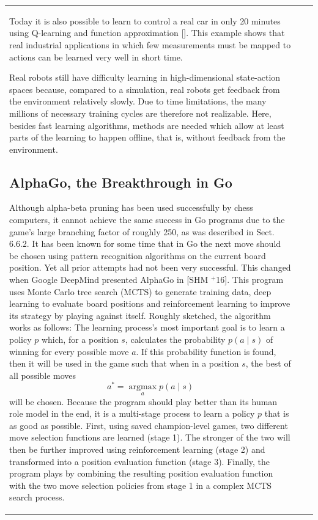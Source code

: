 \documentclass[10pt]{book}
\begin{document}
\begin{center}
\begin{tabular}{|l|l|l|}
Today it is also possible to learn to control a real car in only 20 minutes using Q-learning and function approximation [\cite{rmd07}]. This example shows that real industrial applications in which few measurements must be mapped to actions can be learned very well in short time.

Real robots still have difficulty learning in high-dimensional state-action spaces because, compared to a simulation, real robots get feedback from the environment relatively slowly. Due to time limitations, the many millions of necessary training cycles are therefore not realizable. Here, besides fast learning algorithms, methods are needed which allow at least parts of the learning to happen offline, that is, without feedback from the environment.

\subsection{AlphaGo, the Breakthrough in Go}
Although alpha-beta pruning has been used successfully by chess computers, it cannot achieve the same success in Go programs due to the game's large branching factor of roughly 250, as was described in Sect. 6.6.2. It has been known for some time that in Go the next move should be chosen using pattern recognition algorithms on the current board position. Yet all prior attempts had not been very successful. This changed when Google DeepMind presented AlphaGo in [SHM ${}^{+}$16]. This program uses Monte Carlo tree search (MCTS) to generate training data, deep learning to evaluate board positions and reinforcement learning to improve its strategy by playing against itself. Roughly sketched, the algorithm works as follows:
The learning process's most important goal is to learn a policy $p$ which, for a position $s$, calculates the probability $p(a \mid s)$ of winning for every possible move $a$. If this probability function is found, then it will be used in the game such that when in a position $s$, the best of all possible moves
$$
a^{*}=\underset{a}{\operatorname{argmax}} p(a \mid s)
$$
will be chosen. Because the program should play better than its human role model in the end, it is a multi-stage process to learn a policy $p$ that is as good as possible. First, using saved champion-level games, two different move selection functions are learned (stage 1). The stronger of the two will then be further improved using reinforcement learning (stage 2) and transformed into a position evaluation function (stage 3). Finally, the program plays by combining the resulting position evaluation function with the two move selection policies from stage 1 in a complex MCTS search process.


\end{tabular}
\end{center}
\end{document}

